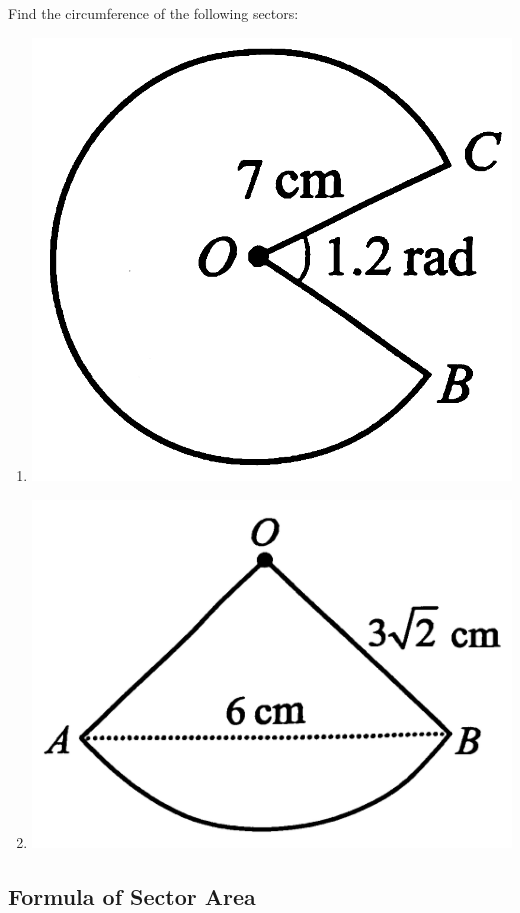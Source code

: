 \documentclass{report}
\begin{document}
Find the circumference of the following sectors:
\begin{multicols}{2}
	\begin{enumerate}[label=(\alph*)]
		\item \includegraphics[scale=0.12,valign=t]{assets/8-9.png}
		\item \includegraphics[scale=0.12,valign=t]{assets/8-10.png}
	\end{enumerate}
\end{multicols}

\subsection*{Formula of Sector Area}
\end{document}
